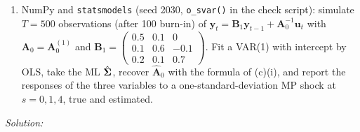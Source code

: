 \documentclass[11pt,a4paper]{article}
\newif\ifsolucoes
\newcommand{\espacoresol}{4.5cm}   %
\newcommand{\resolespaco}{\ifsolucoes\else\par\textit{Solution:}\vspace{\espacoresol}\par\fi}
\begin{document}
\begin{enumerate}[label=(\alph*),leftmargin=2em]
\[\]
$P_1$ is the system of (b) plus ``producers do not react to commodity prices within the period''.
(i) Show that $P_1$ is non-recursive (no reordering of variables and equations makes $\bm A_0$ triangular), and derive $\bm A_0$
from $\bSigma$ in closed form, normalizing the own-variable element of each equation ($R_t$ in MP, $\Delta\log Y_t$ in PS,
$\Delta\log P_{c,t}$ in Inf) to be positive.
(ii) Compute the rank of $\bm J$ at
$\bm A_0^{(1)}=\begin{pmatrix}-0.5&0&2\\0&1.5&0\\1.2&-0.6&0.8\end{pmatrix}$,
$\bm A_0^{(2)}=\begin{pmatrix}1&0.5&0\\0&1&0.5\\0.5&0&1\end{pmatrix}$,
$\bm A_0^{(3)}=\begin{pmatrix}1&0.5&0\\0.6&1&0\\0&0.4&1\end{pmatrix}$ (patterns $P_1$, $P_2$, $P_3$), and explain
analytically why $P_3$ fails.
(iii) Show that $\tilde{\bm A}_0=\begin{pmatrix}0.5&1&0\\0&0.5&1\\1&0&0.5\end{pmatrix}$ satisfies $P_2$, has a positive diagonal, and
$\tilde{\bm A}_0'\tilde{\bm A}_0=\bm A_0^{(2)\prime}\bm A_0^{(2)}$. What does this say about local versus global identification
(the definition on p.~34)?
\item NumPy and \texttt{statsmodels} (seed 2030, \texttt{o\_svar()} in the check script): simulate $T=500$ observations
(after 100 burn-in) of $\bm y_t=\bm B_1\bm y_{t-1}+\bm A_0^{-1}\bm u_t$ with $\bm A_0=\bm A_0^{(1)}$ and
$\bm B_1=\begin{pmatrix}0.5&0.1&0\\0.1&0.6&-0.1\\0.2&0.1&0.7\end{pmatrix}$. Fit a VAR(1) with intercept by OLS, take the ML
$\hat{\bm{\Sigma}}$, recover $\hat{\bm A}_0$ with the formula of (c)(i), and report the responses of the three variables to a
one-standard-deviation MP shock at $s=0,1,4$, true and estimated.
\end{enumerate}
\resolespaco
\end{document}
